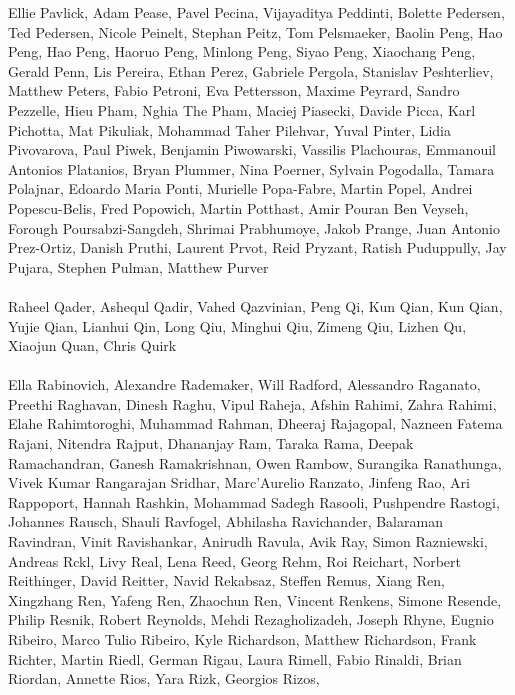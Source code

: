 \documentclass[11pt]{article}
\begin{document}
\begin{description}[itemsep=4mm, style=nextline]
Ellie Pavlick, 
Adam Pease, 
Pavel Pecina, 
Vijayaditya Peddinti, 
Bolette Pedersen, 
Ted Pedersen, 
Nicole Peinelt, 
Stephan Peitz, 
Tom Pelsmaeker, 
Baolin Peng, 
Hao Peng, 
Hao Peng, 
Haoruo Peng, 
Minlong Peng, 
Siyao Peng, 
Xiaochang Peng, 
Gerald Penn, 
Lis Pereira, 
Ethan Perez, 
Gabriele Pergola, 
Stanislav Peshterliev, 
Matthew Peters, 
Fabio Petroni, 
Eva Pettersson, 
Maxime Peyrard, 
Sandro Pezzelle, 
Hieu Pham, 
Nghia The Pham, 
Maciej Piasecki, 
Davide Picca, 
Karl Pichotta, 
Mat Pikuliak, 
Mohammad Taher Pilehvar, 
Yuval Pinter, 
Lidia Pivovarova, 
Paul Piwek, 
Benjamin Piwowarski, 
Vassilis Plachouras, 
Emmanouil Antonios Platanios, 
Bryan Plummer, 
Nina Poerner, 
Sylvain Pogodalla, 
Tamara Polajnar, 
Edoardo Maria Ponti, 
Murielle Popa-Fabre, 
Martin Popel, 
Andrei Popescu-Belis, 
Fred Popowich, 
Martin Potthast, 
Amir Pouran Ben Veyseh, 
Forough Poursabzi-Sangdeh, 
Shrimai Prabhumoye, 
Jakob Prange, 
Juan Antonio Prez-Ortiz, 
Danish Pruthi, 
Laurent Prvot, 
Reid Pryzant, 
Ratish Puduppully, 
Jay Pujara, 
Stephen Pulman, 
Matthew Purver
\\
\\
Raheel Qader, 
Ashequl Qadir, 
Vahed Qazvinian, 
Peng Qi, 
Kun Qian, 
Kun Qian, 
Yujie Qian, 
Lianhui Qin, 
Long Qiu, 
Minghui Qiu, 
Zimeng Qiu, 
Lizhen Qu, 
Xiaojun Quan, 
Chris Quirk
\\
\\
Ella Rabinovich, 
Alexandre Rademaker, 
Will Radford, 
Alessandro Raganato, 
Preethi Raghavan, 
Dinesh Raghu, 
Vipul Raheja, 
Afshin Rahimi, 
Zahra Rahimi, 
Elahe Rahimtoroghi, 
Muhammad Rahman, 
Dheeraj Rajagopal, 
Nazneen Fatema Rajani, 
Nitendra Rajput, 
Dhananjay Ram, 
Taraka Rama, 
Deepak Ramachandran, 
Ganesh Ramakrishnan, 
Owen Rambow, 
Surangika Ranathunga, 
Vivek Kumar Rangarajan Sridhar, 
Marc'Aurelio Ranzato, 
Jinfeng Rao, 
Ari Rappoport, 
Hannah Rashkin, 
Mohammad Sadegh Rasooli, 
Pushpendre Rastogi, 
Johannes Rausch, 
Shauli Ravfogel, 
Abhilasha Ravichander, 
Balaraman Ravindran, 
Vinit Ravishankar, 
Anirudh Ravula, 
Avik Ray, 
Simon Razniewski, 
Andreas Rckl, 
Livy Real, 
Lena Reed, 
Georg Rehm, 
Roi Reichart, 
Norbert Reithinger, 
David Reitter, 
Navid Rekabsaz, 
Steffen Remus, 
Xiang Ren, 
Xingzhang Ren, 
Yafeng Ren, 
Zhaochun Ren, 
Vincent Renkens, 
Simone Resende, 
Philip Resnik, 
Robert Reynolds, 
Mehdi Rezagholizadeh, 
Joseph Rhyne, 
Eugnio Ribeiro, 
Marco Tulio Ribeiro, 
Kyle Richardson, 
Matthew Richardson, 
Frank Richter, 
Martin Riedl, 
German Rigau, 
Laura Rimell, 
Fabio Rinaldi, 
Brian Riordan, 
Annette Rios, 
Yara Rizk, 
Georgios Rizos, 

\end{description}
\end{document}
